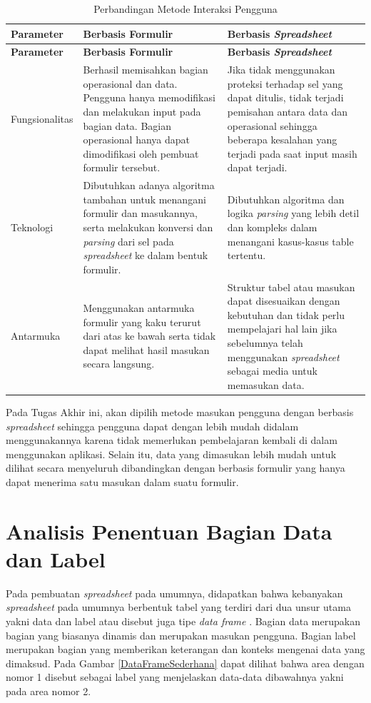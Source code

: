 	\begin{small}
	\begin{longtable}{ | p{3cm} | p{4cm} | p{4cm} | }
	    \caption{Perbandingan Metode Interaksi Pengguna}
	    \label{ModelInteraksi}\\ \hline
	    \centering\bfseries{Parameter} & \centering\bfseries{Berbasis Formulir} & \centering\bfseries{Berbasis \textit{Spreadsheet}} \tabularnewline \hline
	    \endfirsthead
	    \hline
	    \centering\bfseries{Parameter} & \centering\bfseries{Berbasis Formulir} & \centering\bfseries{Berbasis \textit{Spreadsheet}} \tabularnewline \hline
	    \endhead
	    Fungsionalitas & Berhasil memisahkan bagian operasional dan data. Pengguna hanya memodifikasi dan melakukan input pada bagian data. Bagian operasional hanya dapat dimodifikasi oleh pembuat formulir tersebut. & Jika tidak menggunakan proteksi terhadap sel yang dapat ditulis, tidak terjadi pemisahan antara data dan operasional sehingga beberapa kesalahan yang terjadi pada saat input masih dapat terjadi. \\ \hline
	    Teknologi & Dibutuhkan adanya algoritma tambahan untuk menangani formulir dan masukannya, serta melakukan konversi dan \textit{parsing} dari sel pada \textit{spreadsheet} ke dalam bentuk formulir. & Dibutuhkan algoritma dan logika \textit{parsing} yang lebih detil dan kompleks dalam menangani kasus-kasus table tertentu. \\ \hline
	    Antarmuka & Menggunakan antarmuka formulir yang kaku terurut dari atas ke bawah serta tidak dapat melihat hasil masukan secara langsung. & Struktur tabel atau masukan dapat disesuaikan dengan kebutuhan dan tidak perlu mempelajari hal lain jika sebelumnya telah menggunakan \textit{spreadsheet} sebagai media untuk memasukan data. \\ \hline
  	\end{longtable}
	\end{small}

  	Pada Tugas Akhir ini, akan dipilih metode masukan pengguna dengan berbasis \textit{spreadsheet} sehingga pengguna dapat dengan lebih mudah didalam menggunakannya karena tidak memerlukan pembelajaran kembali di dalam menggunakan aplikasi. Selain itu, data yang dimasukan lebih mudah untuk dilihat secara menyeluruh dibandingkan dengan berbasis formulir yang hanya dapat menerima satu masukan dalam suatu formulir.

\section{Analisis Penentuan Bagian Data dan Label}
Pada pembuatan \textit{spreadsheet} pada umumnya, didapatkan bahwa kebanyakan \textit{spreadsheet} pada umumnya berbentuk tabel yang terdiri dari dua unsur utama yakni data dan label atau disebut juga tipe \textit{data frame} \citep{Chen2013}. Bagian data merupakan bagian yang biasanya dinamis dan merupakan masukan pengguna. Bagian label merupakan bagian yang memberikan keterangan dan konteks mengenai data yang dimaksud. Pada Gambar \ref{DataFrameSederhana} dapat dilihat bahwa area dengan nomor 1 disebut sebagai label yang menjelaskan data-data dibawahnya yakni pada area nomor 2.

